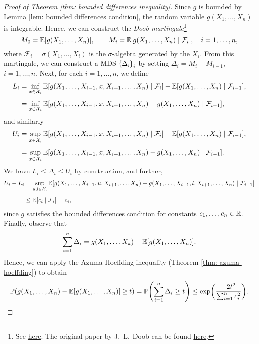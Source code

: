 \begin{proof}[Proof of Theorem \ref{thm: bounded differences inequality}]
Since $g$ is bounded by Lemma \ref{lem: bounded differences condition}, the random variable $g(X_1, \dots, X_n)$ is integrable. Hence, we can construct the \emph{Doob martingale}\footnote{See \href{https://en.wikipedia.org/wiki/Doob_martingale}{here}. The original paper by J.~L.~Doob can be found \href{https://www.ams.org/journals/tran/1940-047-03/S0002-9947-1940-0002052-6/S0002-9947-1940-0002052-6.pdf}{here}.}
\[
    M_0 = \operatorname{\mathbb{E}}[g(X_1, \dots, X_n)], \qquad M_i = \operatorname{\mathbb{E}}[g(X_1, \dots, X_n) \mathrel{|} \mathcal{F}_i], \quad i = 1, \dots, n,
\]
where $\mathcal{F}_i = \sigma(X_1, \dots, X_i)$ is the $\sigma$-algebra generated by the $X_i$. From this martingale, we can construct a MDS $\set{\Delta_i}_i$ by setting $\Delta_i = M_i - M_{i-1}$, $i = 1, \dots, n$. Next, for each $i = 1, \dots, n$, we define
\begin{align*}
    L_i &= \inf_{x \in \mathcal{X}_i} \operatorname{\mathbb{E}}[g(X_1, \dots, X_{i-1}, x, X_{i+1}, \dots, X_n) \mathrel{|} \mathcal{F}_i] - \operatorname{\mathbb{E}}[g(X_1, \dots, X_n) \mathrel{|} \mathcal{F}_{i-1}], \\[4pt]
    &= \inf_{x \in \mathcal{X}_i} \operatorname{\mathbb{E}}[g(X_1, \dots, X_{i-1}, x, X_{i+1}, \dots, X_n) - g(X_1, \dots, X_n) \mathrel{|} \mathcal{F}_{i-1}],
\end{align*}
and similarly
\begin{align*}
    U_i &= \sup_{x \in \mathcal{X}_i} \operatorname{\mathbb{E}}[g(X_1, \dots, X_{i-1}, x, X_{i+1}, \dots, X_n) \mathrel{|} \mathcal{F}_i] - \operatorname{\mathbb{E}}[g(X_1, \dots, X_n) \mathrel{|} \mathcal{F}_{i-1}], \\[4pt]
    &= \sup_{x \in \mathcal{X}_i} \operatorname{\mathbb{E}}[g(X_1, \dots, X_{i-1}, x, X_{i+1}, \dots, X_n) - g(X_1, \dots, X_n) \mathrel{|} \mathcal{F}_{i-1}].
\end{align*}
We have $L_i \leq \Delta_i \leq U_i$ by construction, and further,
\begin{align*}
    U_i - L_i &= \sup_{u, l \in \mathcal{X}_i} \operatorname{\mathbb{E}}[g(X_1, \dots, X_{i-1}, u, X_{i+1}, \dots, X_n) - g(X_1, \dots, X_{i-1}, l, X_{i+1}, \dots, X_n) \mathrel{|} \mathcal{F}_{i-1}] \\[4pt]
    &\leq \operatorname{\mathbb{E}}[c_i \mathrel{|} \mathcal{F}_i] = c_i,
\end{align*}
since $g$ satisfies the bounded differences condition for constants $c_1, \dots, c_n \in \mathbb{R}$. Finally, observe that
\[
    \sum_{i=1}^n \Delta_i = g(X_1, \dots, X_n) - \operatorname{\mathbb{E}}[g(X_1, \dots, X_n)].
\]
Hence, we can apply the Azuma-Hoeffding inequality (Theorem \ref{thm: azuma-hoeffding}) to obtain
\[
    \P(g(X_1, \dots, X_n) - \Exp[g(X_1, \dots, X_n)] \geq t) = \P\left(\sum_{i=1}^n \Delta_i \geq t\right) \leq \exp(\frac{-2t^2}{\sum_{i=1}^n c_i^2}). \qedhere
\]
\end{proof}

